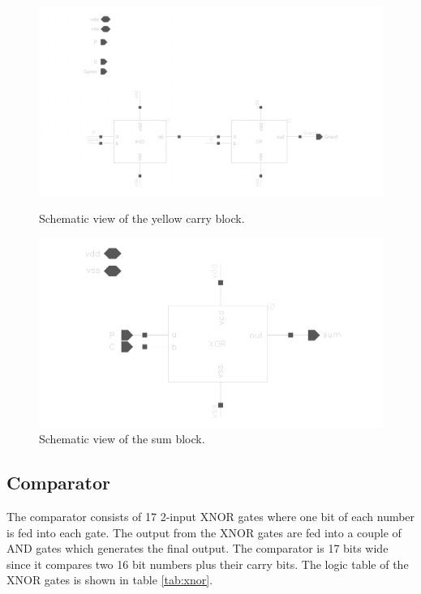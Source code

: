 \begin{figure}[H]
  \centering
  \captionsetup{justification=centering}
  {\includegraphics[width=1.2\textwidth]{../figures/yellow_carry}}
  \caption{Schematic view of the yellow carry block.} \label{fig:yellow_c}
\end{figure}

\begin{figure}[H]
  \centering
  \captionsetup{justification=centering}
  \includegraphics[clip,width=1.0\textwidth]{../figures/sum}
  \caption{Schematic view of the sum block.} \label{fig:sum}
\end{figure}

\subsection{Comparator}
The comparator consists of 17 2-input XNOR gates where one bit of each number is fed into each gate. The output from the XNOR gates are fed into a couple of AND gates which generates the final output. The comparator is 17 bits wide since it compares two 16 bit numbers plus their carry bits. The logic table of the XNOR gates is shown in table \ref{tab:xnor}.

